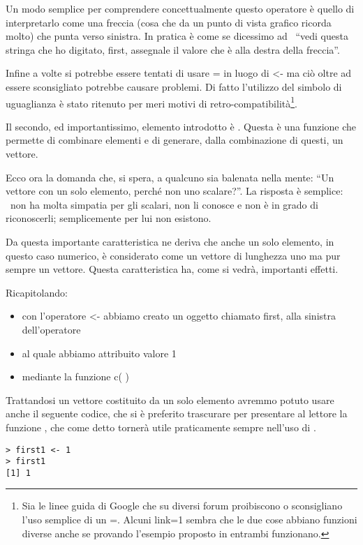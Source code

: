 Un modo semplice per comprendere concettualmente questo operatore è quello di interpretarlo come una freccia (cosa che da un punto di vista grafico ricorda molto) che punta verso sinistra. In pratica è come se dicessimo ad \erre\ ``vedi questa stringa che ho digitato, first, assegnale il valore che è alla destra della freccia''.

Infine a volte si potrebbe essere tentati di usare = in luogo di <- ma ciò oltre ad essere sconsigliato potrebbe causare problemi. Di fatto l'utilizzo del simbolo di uguaglianza è stato ritenuto per meri motivi di retro-compatibilità\footnote{Sia le linee guida di Google che su diversi forum proibiscono o sconsigliano l'uso semplice di un =. Alcuni link=1 sembra che le due cose abbiano funzioni diverse anche se provando l'esempio proposto in \erre entrambi funzionano.}.

Il secondo, ed importantissimo, elemento introdotto è . Questa è una funzione che permette di combinare elementi e di generare, dalla combinazione di questi, un vettore.

Ecco ora la domanda che, si spera, a qualcuno sia balenata nella mente: ``Un vettore con un solo elemento, perché non uno scalare?''. La risposta è semplice: \erre\ non ha molta simpatia per gli scalari, non li conosce e non è in grado di riconoscerli; semplicemente per lui non esistono.

Da questa importante caratteristica ne deriva che anche un solo elemento, in questo caso numerico, è considerato come un vettore di lunghezza uno ma pur sempre un vettore. Questa caratteristica ha, come si vedrà, importanti effetti.

Ricapitolando:
\begin{itemize}
\item  con l'operatore <- abbiamo creato un oggetto chiamato first, alla sinistra dell'operatore
\item al quale abbiamo attribuito valore 1
\item mediante la funzione c( )
\end{itemize}

Trattandosi un vettore costituito da un solo elemento avremmo potuto usare anche il seguente codice, che si è preferito trascurare per presentare al lettore la funzione , che come detto tornerà utile praticamente sempre nell'uso di \erre.
\begin{lstlisting}
> first1 <- 1
> first1
[1] 1
\end{lstlisting}

